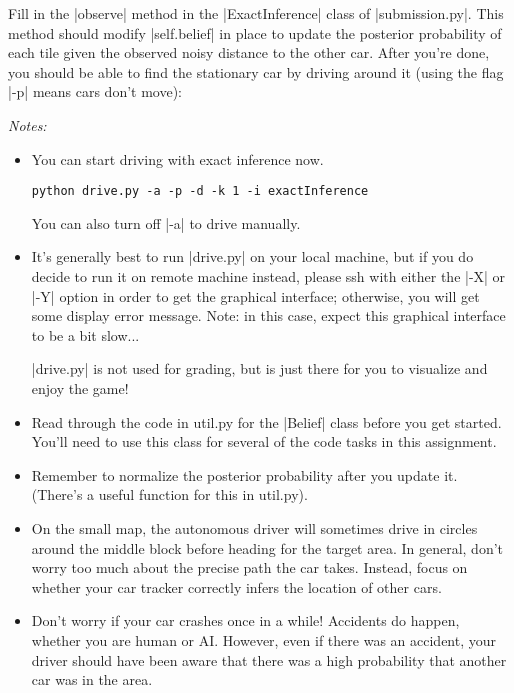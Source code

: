 \item {}
Fill in the |observe| method in the |ExactInference| class of |submission.py|.
This method should modify |self.belief| in place to update the posterior
probability of each tile given the observed noisy distance to the other car.
After you're done, you should be able to find the stationary car by driving
around it (using the flag |-p| means cars don't move):

{\em Notes:
\begin{itemize}
  \item You can start driving with exact inference now. 

\begin{lstlisting}
python drive.py -a -p -d -k 1 -i exactInference
\end{lstlisting}
  You can also turn off |-a| to drive manually.

  \item  It's generally best to run |drive.py| on your local machine, but if you
  do decide to run it on remote machine instead, please ssh with either the |-X|
  or |-Y| option in order to get the graphical interface; otherwise, you will get
  some display error message. Note: in this case, expect this graphical interface
  to be a bit slow...

  |drive.py| is not used for grading, but is just there for you to visualize and
  enjoy the game!

  \item Read through the code in util.py for the |Belief| class before you get
  started. You'll need to use this class for several of the code tasks in this
  assignment.

  \item Remember to normalize the posterior probability after you update it.
  (There's a useful function for this in util.py).

  \item On the small map, the autonomous driver will sometimes drive in circles
  around the middle block before heading for the target area. In general, don't
  worry too much about the precise path the car takes. Instead, focus on whether
  your car tracker correctly infers the location of other cars.

  \item Don't worry if your car crashes once in a while! Accidents do happen,
  whether you are human or AI. However, even if there was an accident, your driver
  should have been aware that there was a high probability that another car was in
the area.
\end{itemize}}
